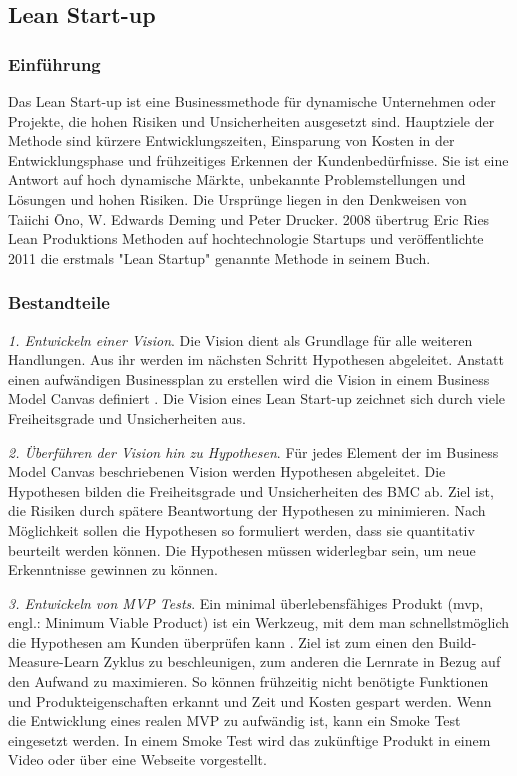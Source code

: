\subsection{Lean Start-up}
\subsubsection*{Einführung}
Das Lean Start-up ist eine Businessmethode für dynamische Unternehmen oder Projekte, die hohen Risiken und Unsicherheiten ausgesetzt sind. 
Hauptziele der Methode sind kürzere Entwicklungszeiten, Einsparung von Kosten in der Entwicklungsphase und frühzeitiges Erkennen der Kundenbedürfnisse. 
Sie ist eine Antwort auf hoch dynamische Märkte, unbekannte Problemstellungen und Lösungen und hohen Risiken. Die Ursprünge liegen in den Denkweisen von Taiichi Ōno, W. Edwards Deming und Peter Drucker. 
2008 übertrug Eric Ries Lean Produktions Methoden auf hochtechnologie Startups und veröffentlichte 2011 die erstmals "Lean Startup" genannte Methode in seinem Buch. %


\subsubsection*{Bestandteile}

\textit{1. Entwickeln einer Vision}. Die Vision dient als Grundlage für alle weiteren Handlungen. Aus ihr werden im nächsten Schritt Hypothesen abgeleitet. Anstatt einen aufwändigen Businessplan zu erstellen wird die Vision in einem Business Model Canvas definiert \cite{Blank2013}. Die Vision eines Lean Start-up zeichnet sich durch viele Freiheitsgrade und Unsicherheiten aus. 

\textit{2. Überführen der Vision hin zu Hypothesen}. Für jedes Element der im Business Model Canvas beschriebenen Vision werden Hypothesen abgeleitet. Die Hypothesen bilden die Freiheitsgrade und Unsicherheiten des BMC ab. Ziel ist, die Risiken durch spätere Beantwortung der Hypothesen zu minimieren. Nach Möglichkeit sollen die Hypothesen so formuliert werden, dass sie quantitativ beurteilt werden können. Die Hypothesen müssen widerlegbar sein, um neue Erkenntnisse gewinnen zu können. 

\textit{3. Entwickeln von MVP Tests}. Ein minimal überlebensfähiges Produkt (\gls{mvp}, engl.: Minimum Viable Product) ist ein Werkzeug, mit dem man schnellstmöglich die Hypothesen am Kunden überprüfen kann \cite[93]{Ries2011}. Ziel ist zum einen den Build-Measure-Learn Zyklus zu beschleunigen, zum anderen die Lernrate in Bezug auf den Aufwand zu maximieren. So können frühzeitig nicht benötigte Funktionen und Produkteigenschaften erkannt und Zeit und Kosten gespart werden. Wenn die Entwicklung eines realen MVP zu aufwändig ist, kann ein Smoke Test eingesetzt werden. In einem Smoke Test wird das zukünftige Produkt in einem Video oder über eine Webseite vorgestellt.

